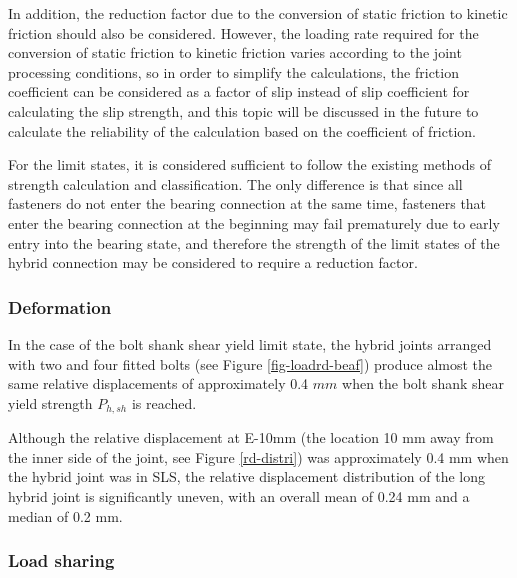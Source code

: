 In addition, the reduction factor due to the conversion of static friction to kinetic friction should also be considered. However, the loading rate required for the conversion of static friction to kinetic friction varies according to the joint processing conditions, so in order to simplify the calculations, the friction coefficient can be considered as a factor of slip instead of slip coefficient for calculating the slip strength, and this topic will be discussed in the future to calculate the reliability of the calculation based on the coefficient of friction.

For the limit states, it is considered sufficient to follow the existing methods of strength calculation and classification. The only difference is that since all fasteners do not enter the bearing connection at the same time, fasteners that enter the bearing connection at the beginning may fail prematurely due to early entry into the bearing state, and therefore the strength of the limit states of the hybrid connection may be considered to require a reduction factor.


\subsubsection*{Deformation}

 In the case of the bolt shank shear yield limit state, the hybrid joints arranged with two and four fitted bolts (see Figure \ref{fig-loadrd-beaf}) produce almost the same relative displacements of approximately 0.4 $mm$ when the bolt shank shear yield strength $P_{h,sh}$ is reached. 
    

Although the relative displacement at E-10mm (the location 10 mm away from the inner side of the joint, see Figure \ref{rd-distri}) was approximately 0.4 mm when the hybrid joint was in SLS, the relative displacement distribution of the long hybrid joint is significantly uneven, with an overall mean of 0.24 mm and a median of 0.2 mm.
    

\subsubsection*{Load sharing}

